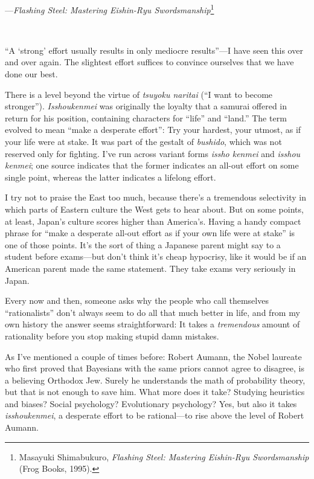 {\raggedleft
 {}---\textit{Flashing Steel: Mastering Eishin-Ryu
Swordsmanship}\footnote{Masayuki Shimabukuro, \textit{Flashing Steel: Mastering
Eishin-Ryu Swordsmanship} (Frog Books, 1995).}
\par}


\bigskip

{
 ~}

{
 ``A `strong'
effort usually results in only mediocre results''---I
have seen this over and over again. The slightest effort suffices to
convince ourselves that we have done our best.}

{
 There is a level beyond the virtue of \textit{tsuyoku naritai}
(``I want to become stronger'').
\textit{Isshoukenmei} was originally the loyalty that a samurai offered
in return for his position, containing characters for
``life'' and
``land.'' The term evolved to mean
``make a desperate effort'': Try
your hardest, your utmost, as if your life were at stake. It was part
of the gestalt of \textit{bushido}, which was not reserved only for
fighting. I've run across variant forms \textit{issho
kenmei} and \textit{isshou kenmei}; one source indicates that the
former indicates an all-out effort on some single point, whereas the
latter indicates a lifelong effort.}

{
 I try not to praise the East too much, because
there's a tremendous selectivity in which parts of
Eastern culture the West gets to hear about. But on some points, at
least, Japan's culture scores higher than
America's. Having a handy compact phrase for
``make a desperate all-out effort as if your own life
were at stake'' is one of those points.
It's the sort of thing a Japanese parent might say to a
student before exams---but don't think
it's cheap hypocrisy, like it would be if an American
parent made the same statement. They take exams very seriously in
Japan.}

{
 Every now and then, someone asks why the people who call
themselves ``rationalists''
don't always seem to do all that much better in life,
and from my own history the answer seems straightforward: It takes a
\textit{tremendous} amount of rationality before you stop making stupid
damn mistakes.}

{
 As I've mentioned a couple of times before: Robert
Aumann, the Nobel laureate who first proved that Bayesians with the
same priors cannot agree to disagree, is a believing Orthodox Jew.
Surely he understands the math of probability theory, but that is not
enough to save him. What more does it take? Studying heuristics and
biases? Social psychology? Evolutionary psychology? Yes, but also it
takes \textit{isshoukenmei}, a desperate effort to be rational---to
rise above the level of Robert Aumann.}

